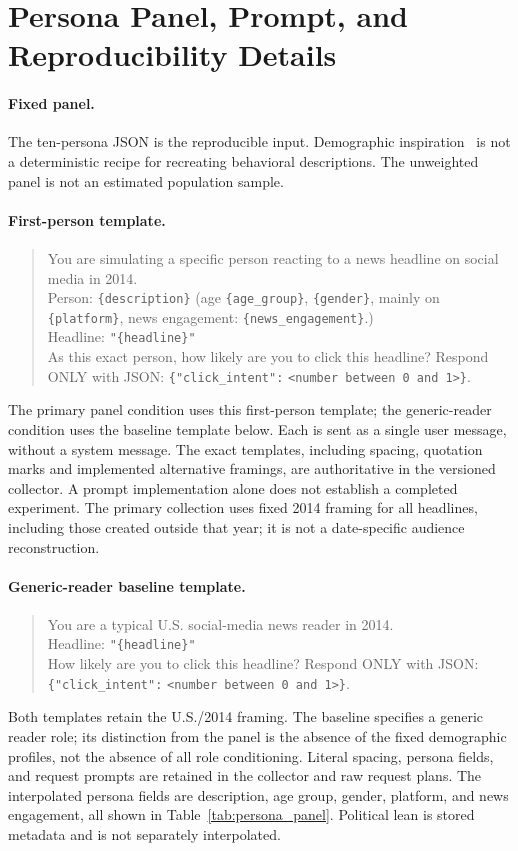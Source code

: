 \section{Persona Panel, Prompt, and Reproducibility Details}
\label{sec:appendix}
\paragraph{Fixed panel.}
The ten-persona JSON is the reproducible input. Demographic inspiration~\citep{holcomb2013newsuse}
is not a deterministic recipe for recreating behavioral descriptions. The unweighted panel is
not an estimated population sample.

\paragraph{First-person template.}
\begin{quote}\small
You are simulating a specific person reacting to a news headline on social media in 2014.\\
Person: \verb|{description}| (age \verb|{age_group}|, \verb|{gender}|, mainly on \verb|{platform}|,
news engagement: \verb|{news_engagement}|.)\\
Headline: \verb|"{headline}"|\\
As this exact person, how likely are you to click this headline? Respond ONLY with JSON:
\verb|{"click_intent":| \verb|<number between 0 and 1>}|.
\end{quote}
The primary panel condition uses this first-person template; the generic-reader condition uses
the baseline template below. Each is sent as a single user message, without a system message.
The exact templates, including spacing, quotation marks and implemented alternative framings,
are authoritative in the versioned collector. A prompt implementation alone does not
establish a completed experiment. The primary collection uses fixed 2014 framing for all
headlines, including those created outside that year; it is not a date-specific audience
reconstruction.

\paragraph{Generic-reader baseline template.}
\begin{quote}\small
You are a typical U.S. social-media news reader in 2014.\\
Headline: \verb|"{headline}"|\\
How likely are you to click this headline? Respond ONLY with JSON:
\verb|{"click_intent":| \verb|<number between 0 and 1>}|.
\end{quote}
Both templates retain the U.S./2014 framing. The baseline specifies a generic reader role;
its distinction from the panel is the absence of the fixed demographic profiles, not the
absence of all role conditioning. Literal spacing, persona fields, and request prompts are
retained in the collector and raw request plans. The interpolated persona fields are description,
age group, gender, platform, and news engagement, all shown in Table~\ref{tab:persona_panel}.
Political lean is stored metadata and is not separately interpolated.

